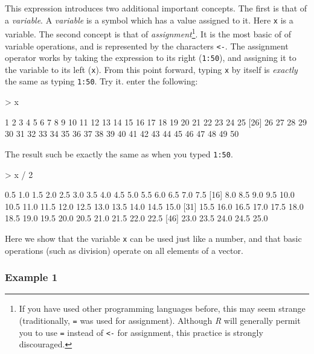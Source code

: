 \documentclass[10pt,letterpaper]{article}
\begin{document}
This expression introduces two additional important concepts.  The first is that of a \emph{variable}.  A \emph{variable} is a symbol which has a value assigned to it.  Here \texttt{x} is a variable.  The second concept is that of \emph{assignment}\footnote{If you have used other programming languages before, this may seem strange (traditionally, \texttt{=} was used for assignment).  Although \emph{R} will generally permit you to use \texttt{=} instead of \texttt{<-} for assignment, this practice is strongly discouraged.}.  It is the most basic of of variable operations, and is represented by the characters \texttt{<-}.  The assignment operator works by taking the expression to its right (\texttt{1:50}), and assigning it to the variable to its left (\texttt{x}).  From this point forward, typing \texttt{x} by itself is \emph{exactly} the same as typing \texttt{1:50}.  Try it.  enter the following:
\begin{Schunk}
\begin{Sinput}
> x
\end{Sinput}
\begin{Soutput}
 [1]  1  2  3  4  5  6  7  8  9 10 11 12 13 14 15 16 17 18 19 20 21 22 23 24 25
[26] 26 27 28 29 30 31 32 33 34 35 36 37 38 39 40 41 42 43 44 45 46 47 48 49 50
\end{Soutput}
\end{Schunk}
The result such be exactly the same as when you typed \texttt{1:50}.

\begin{Schunk}
\begin{Sinput}
> x / 2
\end{Sinput}
\begin{Soutput}
 [1]  0.5  1.0  1.5  2.0  2.5  3.0  3.5  4.0  4.5  5.0  5.5  6.0  6.5  7.0  7.5
[16]  8.0  8.5  9.0  9.5 10.0 10.5 11.0 11.5 12.0 12.5 13.0 13.5 14.0 14.5 15.0
[31] 15.5 16.0 16.5 17.0 17.5 18.0 18.5 19.0 19.5 20.0 20.5 21.0 21.5 22.0 22.5
[46] 23.0 23.5 24.0 24.5 25.0
\end{Soutput}
\end{Schunk}

Here we show that the variable \texttt{x} can be used just like a number, and that basic operations (such as division) operate on all elements of a vector.

\subsubsection{Example 1} %
\label{ssub:example_1}
\end{document}

